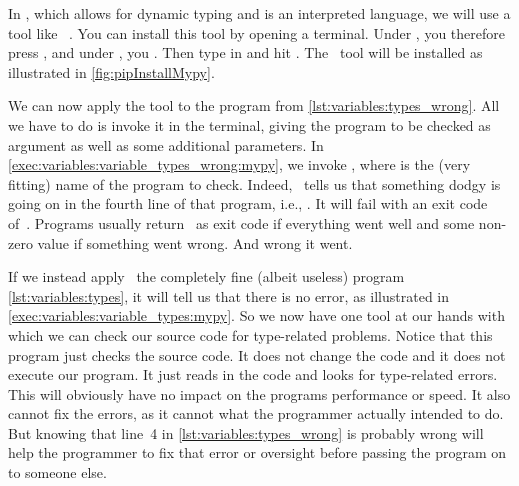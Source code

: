 In \python, which allows for dynamic typing and is an interpreted language, we will use a tool like \mypy~\cite{LLHSVRZSJYYMC2024MOSTFP}.
You can install this tool by opening a terminal.
Under \ubuntu, you therefore press \ubuntuTerminal, and under \windows, you \windowsTerminal.
Then type in  and hit \keys{\enter}.
The \mypy\ tool will be installed as illustrated in \cref{fig:pipInstallMypy}.

We can now apply the tool to the program from \cref{lst:variables:types_wrong}.
All we have to do is invoke it in the terminal, giving the program to be checked as argument as well as some additional parameters.
In \cref{exec:variables:variable_types_wrong:mypy}, we invoke , where  is the (very fitting) name of the program to check.
Indeed, \mypy\ tells us that something dodgy is going on in the fourth line of that program, i.e., .
It will fail with an exit code of~.
Programs usually return~ as exit code if everything went well and some non-zero value if something went wrong.
And wrong it went.

If we instead apply \mypy\ the completely fine (albeit useless) program \cref{lst:variables:types}, it will tell us that there is no error, as illustrated in \cref{exec:variables:variable_types:mypy}.
So we now have one tool at our hands with which we can check our source code for type-related problems.
Notice that this program just checks the source code.
It does not change the code and it does not execute our program.
It just reads in the code and looks for type-related errors.
This will obviously have no impact on the programs performance or speed.
It also cannot fix the errors, as it cannot what the programmer actually intended to do.
But knowing that line~4 in \cref{lst:variables:types_wrong} is probably wrong will help the programmer to fix that error or oversight before passing the program on to someone else.%
%
%
%
\endhsection%
\FloatBarrier%
\endhsection%
%
